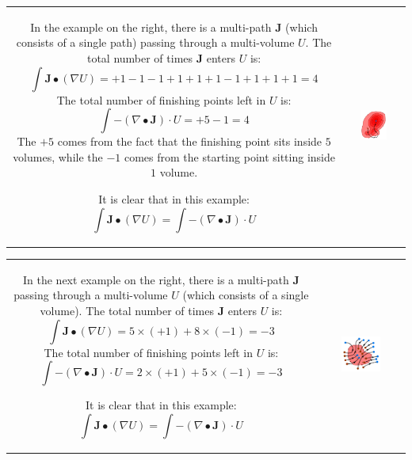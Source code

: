 \documentclass{book}
\begin{document}
\begin{tabular}{cc}
\parbox{0.5\textwidth}{
In the example on the right, there is a multi-path \(\mathbf{J}\) (which consists of a single path) passing through a multi-volume \(U\). The total number of times \(\mathbf{J}\) enters \(U\) is: 
\[\int \mathbf{J} \bullet (\nabla U) = +1 - 1 - 1 + 1 + 1 + 1 - 1 + 1 + 1 + 1 = 4\] 
The total number of finishing points left in \(U\) is:
\[\int -(\nabla \bullet \mathbf{J}) \cdot U = +5 - 1 = 4\]
The \(+5\) comes from the fact that the finishing point sits inside \(5\) volumes, while the \(-1\) comes from the starting point sitting inside \(1\) volume.

It is clear that in this example:
 \[\int \mathbf{J} \bullet (\nabla U) = \int -(\nabla \bullet \mathbf{J}) \cdot U\]

} & \parbox{0.5\textwidth}{
\includegraphics[width = 0.5\textwidth]{Boundaries/Path_endpoints/Gradient_theorem}
}
\end{tabular}

\begin{tabular}{cc}
\parbox{0.5\textwidth}{
In the next example on the right, there is a multi-path \(\mathbf{J}\) passing through a multi-volume \(U\) (which consists of a single volume). The total number of times \(\mathbf{J}\) enters \(U\) is: 
\[\int \mathbf{J} \bullet (\nabla U) = 5 \times (+1) + 8 \times (-1) = -3\] 
The total number of finishing points left in \(U\) is:
\[\int -(\nabla \bullet \mathbf{J}) \cdot U = 2 \times (+1) + 5 \times (-1) = -3\]

It is clear that in this example:
 \[\int \mathbf{J} \bullet (\nabla U) = \int -(\nabla \bullet \mathbf{J}) \cdot U\]

} & \parbox{0.5\textwidth}{
\includegraphics[width = 0.5\textwidth]{Boundaries/Path_endpoints/Divergence_theorem}
}
\end{tabular}
\end{document}
